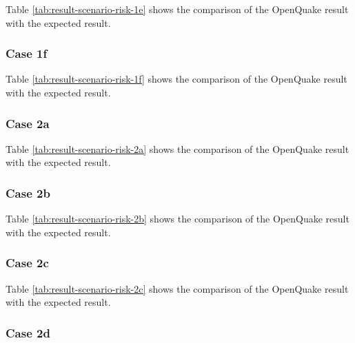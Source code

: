 

Table \ref{tab:result-scenario-risk-1e} shows the comparison of the OpenQuake result with the expected result.

\subsubsection{Case 1f}




Table \ref{tab:result-scenario-risk-1f} shows the comparison of the OpenQuake result with the expected result.

\subsubsection{Case 2a}




Table \ref{tab:result-scenario-risk-2a} shows the comparison of the OpenQuake result with the expected result.

\subsubsection{Case 2b}




Table \ref{tab:result-scenario-risk-2b} shows the comparison of the OpenQuake result with the expected result.

\subsubsection{Case 2c}




Table \ref{tab:result-scenario-risk-2c} shows the comparison of the OpenQuake result with the expected result.

\subsubsection{Case 2d}


